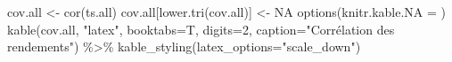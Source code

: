 \documentclass[
]{article}
\newenvironment{Shaded}{\begin{snugshade}}{\end{snugshade}}
\newcommand{\AttributeTok}[1]{\textcolor[rgb]{0.77,0.63,0.00}{#1}}
\newcommand{\ConstantTok}[1]{\textcolor[rgb]{0.00,0.00,0.00}{#1}}
\newcommand{\DecValTok}[1]{\textcolor[rgb]{0.00,0.00,0.81}{#1}}
\newcommand{\FunctionTok}[1]{\textcolor[rgb]{0.00,0.00,0.00}{#1}}
\newcommand{\NormalTok}[1]{#1}
\newcommand{\OtherTok}[1]{\textcolor[rgb]{0.56,0.35,0.01}{#1}}
\newcommand{\SpecialCharTok}[1]{\textcolor[rgb]{0.00,0.00,0.00}{#1}}
\newcommand{\StringTok}[1]{\textcolor[rgb]{0.31,0.60,0.02}{#1}}
\begin{document}
\begin{Shaded}
\begin{Highlighting}[]
\NormalTok{cov.all }\OtherTok{\textless{}{-}} \FunctionTok{cor}\NormalTok{(ts.all)}
\NormalTok{cov.all[}\FunctionTok{lower.tri}\NormalTok{(cov.all)] }\OtherTok{\textless{}{-}} \ConstantTok{NA}
\FunctionTok{options}\NormalTok{(}\AttributeTok{knitr.kable.NA =} \StringTok{\textquotesingle{}\textquotesingle{}}\NormalTok{)}
\FunctionTok{kable}\NormalTok{(cov.all, }\StringTok{"latex"}\NormalTok{, }\AttributeTok{booktabs=}\NormalTok{T, }\AttributeTok{digits=}\DecValTok{2}\NormalTok{, }\AttributeTok{caption=}\StringTok{"Corrélation des rendements"}\NormalTok{) }\SpecialCharTok{\%\textgreater{}\%}
\FunctionTok{kable\_styling}\NormalTok{(}\AttributeTok{latex\_options=}\StringTok{"scale\_down"}\NormalTok{)}
\end{Highlighting}
\end{Shaded}
\end{document}
